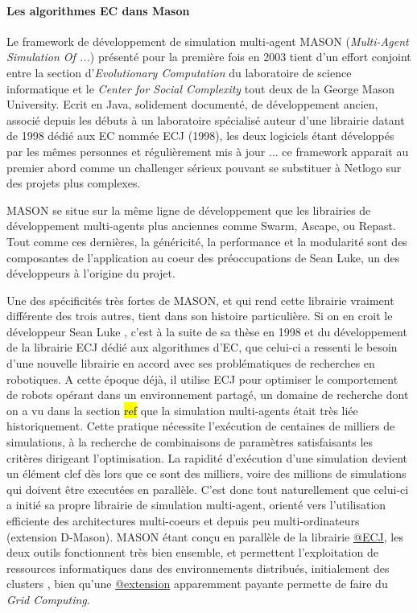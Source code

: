 \paragraph{Les algorithmes EC dans Mason}

Le framework de développement de simulation multi-agent MASON (\textit{Multi-Agent Simulation Of ...}) présenté pour la première fois en 2003 tient d'un effort conjoint entre la section d'\textit{Evolutionary Computation} du laboratoire de science informatique et le \textit{Center for Social Complexity} tout deux de la George Mason University. Ecrit en Java, solidement documenté, de développement ancien, associé depuis les débuts à un laboratoire spécialisé auteur d'une librairie datant de 1998 dédié aux EC nommée ECJ (1998), les deux logiciels étant développés par les mêmes personnes et régulièrement mis à jour ... ce framework apparait au premier abord comme un challenger sérieux pouvant se substituer à Netlogo sur des projets plus complexes.

MASON se situe sur la même ligne de développement que les librairies de développement multi-agents plus anciennes comme Swarm, Ascape, ou Repast. Tout comme ces dernières, la généricité, la performance et la modularité sont des composantes de l'application au coeur des préoccupations de Sean Luke, un des développeurs à l'origine du projet.

Une des spécificités très fortes de MASON, et qui rend cette librairie vraiment différente des trois autres, tient dans son histoire particulière. Si on en croit le développeur Sean Luke , c'est à la suite de sa thèse en 1998 et du développement de la librairie ECJ  dédié aux algorithmes d'EC, que celui-ci a ressenti le besoin d'une nouvelle librairie en accord avec ses problématiques de recherches en robotiques. A cette époque déjà, il utilise ECJ pour optimiser le comportement de robots opérant dans un environnement partagé, un domaine de recherche dont on a vu dans la section \hl{ref} que la simulation multi-agents était très liée historiquement. Cette pratique nécessite l'exécution de centaines de milliers de simulations, à la recherche de combinaisons de paramètres satisfaisants les critères dirigeant l'optimisation. La rapidité d'exécution d'une simulation devient un élément clef dès lors que ce sont des milliers, voire des millions de simulations qui doivent être executées en parallèle. C'est donc tout naturellement que celui-ci a initié sa propre librairie de simulation multi-agent, orienté vers l'utilisation efficiente des architectures multi-coeurs et depuis peu multi-ordinateurs (extension D-Mason). MASON étant conçu en parallèle de la librairie \href{http://cs.gmu.edu/~eclab/projects/ecj/}{@ECJ}, les deux outils fonctionnent très bien ensemble, et permettent l'exploitation de ressources informatiques dans des environnements distribués, initialement des clusters \autocite[211]{Luke2014}, bien qu'une \href{http://www.parabon.com/dev-center/origin}{@extension} apparemment payante permette de faire du \textit{Grid Computing}.


